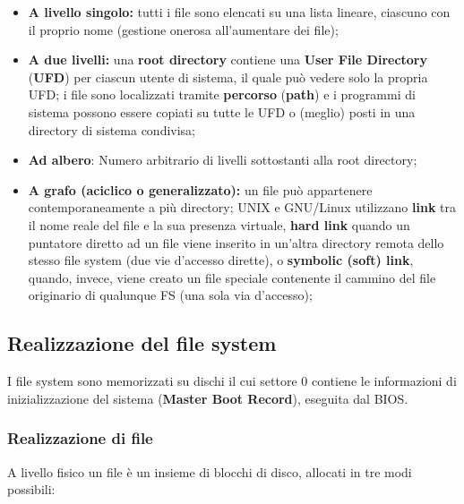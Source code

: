 \documentclass{article}
\begin{document}
\begin{itemize}
    \item \textbf{A livello singolo:} tutti i file sono elencati su una lista lineare, ciascuno con il proprio nome (gestione onerosa all'aumentare dei file);
    \item \textbf{A due livelli:} una \textbf{root directory} contiene una \textbf{User File Directory} (\textbf{UFD}) per ciascun utente di sistema, il quale può vedere solo la propria UFD; i file sono localizzati tramite \textbf{percorso} (\textbf{path}) e i programmi di sistema possono essere copiati su tutte le UFD o (meglio) posti in una directory di sistema condivisa;
    \item \textbf{Ad albero}: Numero arbitrario di livelli sottostanti alla root directory;
    \item \textbf{A grafo (aciclico o generalizzato):}  un file può appartenere contemporaneamente a più directory; UNIX e GNU/Linux utilizzano \textbf{link} tra il nome reale del file e la sua presenza virtuale, \textbf{hard link} quando un puntatore diretto ad un file viene inserito in un'altra directory remota dello stesso file system (due vie d'accesso dirette), o \textbf{symbolic (soft) link}, quando, invece, viene creato un file speciale contenente il cammino del file originario di qualunque FS (una sola via d'accesso);
\end{itemize}

\subsection{Realizzazione del file system} I file system sono memorizzati su dischi il cui settore 0 contiene le informazioni di inizializzazione del sistema (\textbf{Master Boot Record}), eseguita dal BIOS.

\subsubsection{Realizzazione di file} A livello fisico un file è un insieme di blocchi di disco, allocati in tre modi possibili:
\end{document}
